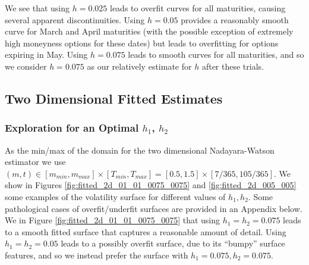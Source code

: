 \documentclass[11pt]{article}
\newlength\tindent
\renewcommand{\indent}{\hspace*{\tindent}}
\begin{document}
\indent We see that using $h = 0.025$ leads to overfit curves for all maturities, causing several apparent discontinuities. Using $h = 0.05$ provides a reasonably smooth curve for March and April maturities (with the possible exception of extremely high moneyness options for these dates) but leads to overfitting for options expiring in May. Using $h = 0.075$ leads to smooth curves for all maturities, and so we consider $h = 0.075$ as our relatively estimate for $h$ after these trials.

\subsection{Two Dimensional Fitted Estimates}

\subsubsection{Exploration for an Optimal $h_1$, $h_2$}

\indent As the min/max of the domain for the two dimensional Nadayara-Watson estimator we use $(m,t) \in [m_{min}, m_{max}]\times[T_{min},T_{max}] = [0.5,1.5]\times[7/365,105/365]$. We show in Figures \ref{fig:fitted_2d_01_01_0075_0075} and \ref{fig:fitted_2d_005_005} some examples of the volatility surface for different values of $h_1, h_2$. Some pathological cases of overfit/underfit surfaces are provided in an Appendix below. We in Figure \ref{fig:fitted_2d_01_01_0075_0075} that using $h_1 = h_2 = 0.075$ leads to a smooth fitted surface that captures a reasonable amount of detail. Using $h_1 = h_2 = 0.05$ leads to a possibly overfit surface, due to its ``bumpy'' surface features, and so we instead prefer the surface with $h_1 = 0.075, h_2 = 0.075$.
\end{document}
